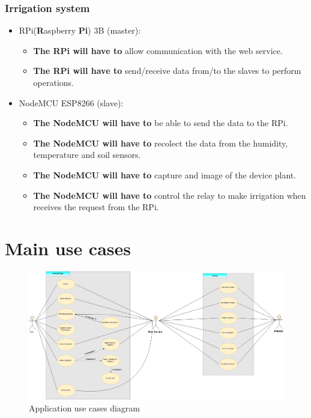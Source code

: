 \documentclass[11pt,a4paper]{article}
\begin{document}
\subsubsection{Irrigation system}
\begin{itemize}
\item RPi(\textbf{R}aspberry \textbf{Pi}) 3B (master):
	\begin{itemize}
	\item \textbf{The RPi will have to} allow communication with the web service.
	\item \textbf{The RPi will have to} send/receive data from/to the slaves to perform operations.
	\end{itemize}

\item NodeMCU ESP8266 (slave):
	\begin{itemize}
	\item \textbf{The NodeMCU will have to} be able to send the data to the RPi. 
	\item \textbf{The NodeMCU will have to} recolect the data from the humidity, temperature and soil sensors.
	\item \textbf{The NodeMCU will have to} capture and image of the device plant.		
	\item \textbf{The NodeMCU will have to} control the relay to make irrigation when receives the request from the RPi.
	\end{itemize}
\end{itemize}

\newpage

\section{Main use cases}
\begin{figure}[hbtp]
\centering
\includegraphics[scale=0.3195,angle=90,origin=c]{figures/usecasediagram.png}
\caption{Application use cases diagram}
\end{figure}
\end{document}
